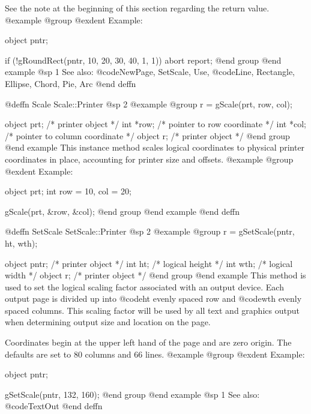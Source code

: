 See the note at the beginning of this section regarding the return value.
@example
@group
@exdent Example:

object  pntr;

if (!gRoundRect(pntr, 10, 20, 30, 40, 1, 1))
        abort report;
@end group
@end example
@sp 1
See also:  @code{NewPage, SetScale, Use,}
        @code{Line, Rectangle, Ellipse, Chord, Pie, Arc}
@end deffn




@deffn {Scale} Scale::Printer
@sp 2
@example
@group
r = gScale(prt, row, col);

object  prt;   /*  printer object              */
int     *row;  /*  pointer to row coordinate   */
int     *col;  /*  pointer to column coordinate */
object  r;     /*  printer object              */
@end group
@end example
This instance method scales logical coordinates to physical printer
coordinates in place, accounting for printer size and offsets.
@example
@group
@exdent Example:

object  prt;
int     row = 10, col = 20;

gScale(prt, &row, &col);
@end group
@end example
@end deffn
















@deffn {SetScale} SetScale::Printer
@sp 2
@example
@group
r = gSetScale(pntr, ht, wth);

object  pntr;   /*  printer object  */
int     ht;     /*  logical height  */
int     wth;    /*  logical width   */
object  r;      /*  printer object  */
@end group
@end example
This method is used to set the logical scaling factor associated with an
output device.  Each output page is divided up into @code{ht} evenly
spaced row and @code{wth} evenly spaced columns.  This scaling factor
will be used by all text and graphics output when determining output size
and location on the page.

Coordinates begin at the upper left hand of the page and are zero origin.
The defaults are set to 80 columns and 66 lines.
@example
@group
@exdent Example:

object  pntr;

gSetScale(pntr, 132, 160);
@end group
@end example
@sp 1
See also:  @code{TextOut}
@end deffn












